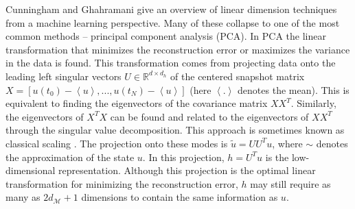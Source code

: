 \documentclass[preprint,aps,pre,letterpaper,onecolumn,superscriptaddress]{revtex4-2} %
\newcommand{\MDG}[1]{\textcolor{magenta}{*** #1 ***}}
\newcommand{\AL}[1]{\textcolor{ao(english)}{*** #1 ***}}
\newcommand{\IM}{\mathcal{M}}
\newcommand{\reals}{\mathbb{R}} %
\begin{document}

Cunningham and Ghahramani \cite{Cunningham2015} give an overview of linear dimension techniques from a machine learning perspective. Many of these collapse to one of the most common methods -- principal component analysis (PCA). In PCA the linear transformation that minimizes the reconstruction error or maximizes the variance in the data is found. This transformation comes from projecting data onto the leading left singular vectors $U\in\mathbb{R}^{d\times d_h}$ of the centered snapshot matrix $X=[u(t_0)-\left<u\right>,...,u(t_N)-\left<u\right>]$ (here $\left<.\right>$ denotes the mean). This is equivalent to finding the eigenvectors of the covariance matrix $X X^T$. Similarly, the eigenvectors of $X^T X$ can be found and related to the eigenvectors of $X X^T$ through the singular value decomposition. This approach is sometimes known as classical scaling \cite{VanDerMaaten2009}. The projection onto these modes is $\tilde{u}=U U^T u$, where $\sim$ denotes the approximation of the state $u$. In this projection, $h=U^T u$ is the low-dimensional representation. Although this projection is the optimal linear transformation for minimizing the reconstruction error, $h$ may still require as many as $2d_\mathcal{M}+1$ dimensions to contain the same information as $u$.
\end{document}
